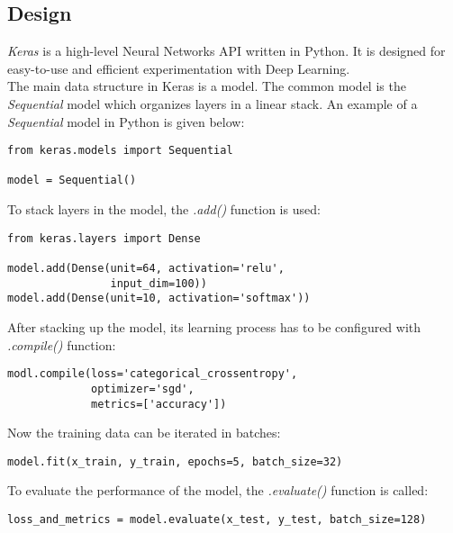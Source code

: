 
\subsection{Design}


\textit{Keras} is a high-level Neural Networks API written in Python. It is
designed for easy-to-use and efficient experimentation with Deep
Learning.~\cite{chollet2015keras}\\


The main data structure in Keras is a model. The common model is the
\textit{Sequential} model which organizes layers in a linear stack. An example
of a \textit{Sequential} model in Python is given below:

\begin{lstlisting}
from keras.models import Sequential

model = Sequential()
\end{lstlisting}

\noindent To stack layers in the model, the \textit{.add()} function is used:

\begin{lstlisting}
from keras.layers import Dense

model.add(Dense(unit=64, activation='relu', 
                input_dim=100))
model.add(Dense(unit=10, activation='softmax'))
\end{lstlisting}

\noindent After stacking up the model, its learning process has to be configured
with \textit{.compile()} function:

\begin{lstlisting}
modl.compile(loss='categorical_crossentropy', 
             optimizer='sgd',
             metrics=['accuracy'])
\end{lstlisting}

\noindent Now the training data can be iterated in batches:

\begin{lstlisting}
model.fit(x_train, y_train, epochs=5, batch_size=32)
\end{lstlisting}

\noindent To evaluate the performance of the model, the \textit{.evaluate()}
function is called:

\begin{lstlisting}
loss_and_metrics = model.evaluate(x_test, y_test, batch_size=128)
\end{lstlisting}
